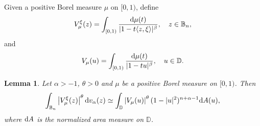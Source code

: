 \documentclass[preprint,12pt,times]{elsarticle}
\newtheorem{lemma}[theorem]{Lemma}
\theoremstyle{definition}
\theoremstyle{remark}
\numberwithin{equation}{section}
\begin{document}
Given a positive Borel measure $\mu$ on $[0,1)$, define 
\[
    V_{\mu}^{\xi}(z)=\int_{[0,1)}\frac{{\rm d}\mu(t)}{|1-t\langle z,\xi\rangle|^{\beta}},\quad z\in\mathbb{B}_n,
\]
and
\[
    V_{\mu}(u)=\int_{[0,1)}\frac{{\rm d}\mu(t)}{|1-tu|^{\beta}},\quad u\in\mathbb{D}.
\]

\begin{lemma}\label{lemma4.1}
Let $\alpha>-1$, $\theta>0$ and $\mu$ be a positive Borel measure on $[0,1)$. Then
\begin{equation}\label{equa4.1}
\int_{\mathbb{B}_n}\left|V_{\mu}^{\xi}(z)\right|^{\theta}{\rm d}v_{\alpha}(z)\simeq \int_{\mathbb{D}}\left|V_{\mu}(u)\right|^{\theta}(1-|u|^2)^{n+\alpha-1}{\rm d}A(u),
\end{equation}
where ${\rm d}A$ is the normalized area measure on $\mathbb{D}$.
\end{lemma}
\end{document}
